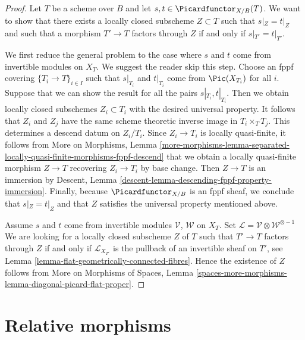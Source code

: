 \begin{proof}
Let $T$ be a scheme over $B$ and let $s, t \in \Picardfunctor_{X/B}(T)$.
We want to show that there exists a locally closed subscheme $Z \subset T$
such that $s|_Z = t|_Z$ and such that a morphism $T' \to T$ factors
through $Z$ if and only if $s|_{T'} = t|_{T'}$.

\medskip\noindent
We first reduce the general problem to the case where $s$ and $t$ come
from invertible modules on $X_T$. We suggest the reader skip this step.
Choose an fppf covering $\{T_i \to T\}_{i \in I}$ such that
$s|_{T_i}$ and $t|_{T_i}$ come from $\Pic(X_{T_i})$ for all $i$.
Suppose that we can show the result for all the pairs
$s|_{T_i}, t|_{T_i}$. Then we obtain locally closed subschemes
$Z_i \subset T_i$ with the desired universal property.
It follows that $Z_i$ and $Z_j$ have the same scheme theoretic
inverse image in $T_i \times_T T_j$.
This determines a descend datum on $Z_i/T_i$.
Since $Z_i \to T_i$ is locally quasi-finite, it follows from
More on Morphisms, Lemma
\ref{more-morphisms-lemma-separated-locally-quasi-finite-morphisms-fppf-descend}
that we obtain a locally quasi-finite morphism $Z \to T$
recovering $Z_i \to T_i$ by base change. Then $Z \to T$ is an immersion
by Descent, Lemma \ref{descent-lemma-descending-fppf-property-immersion}.
Finally, because $\Picardfunctor_{X/B}$ is an fppf sheaf, we conclude
that $s|_Z = t|_Z$ and that $Z$ satisfies the universal property
mentioned above.

\medskip\noindent
Assume $s$ and $t$ come from invertible modules $\mathcal{V}$, $\mathcal{W}$
on $X_T$.
Set $\mathcal{L} = \mathcal{V} \otimes \mathcal{W}^{\otimes -1}$
We are looking for a locally closed subscheme $Z$ of $T$
such that $T' \to T$ factors through $Z$ if and only if $\mathcal{L}_{X_{T'}}$
is the pullback of an invertible sheaf on $T'$, see
Lemma \ref{lemma-flat-geometrically-connected-fibres}.
Hence the existence of $Z$ follows from
More on Morphisms of Spaces, Lemma
\ref{spaces-more-morphisms-lemma-diagonal-picard-flat-proper}.
\end{proof}











\section{Relative morphisms}
\label{section-relative-morphisms}

